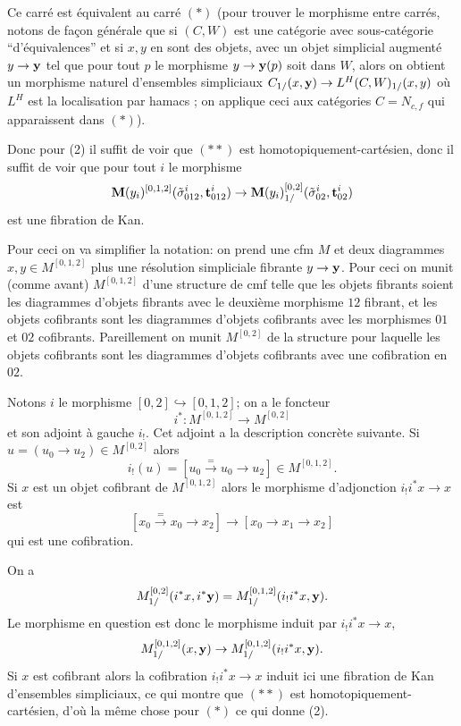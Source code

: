 \documentclass[12pt]{article}
\newcommand{\mm}{{\bf M}}
\begin{document}
Ce carr\'e est \'equivalent au carr\'e $(\ast )$
(pour trouver le morphisme entre carr\'es, notons de fa\c{c}on g\'en\'erale que
si $(C,W)$ est une cat\'egorie avec sous-cat\'egorie ``d'\'equivalences'' et si
$x,y$
en sont des objets, avec un objet simplicial augment\'e $y\rightarrow {\bf y}$
tel que pour tout $p$ le morphisme $y\rightarrow {\bf y}(p)$ soit dans $W$,
alors on obtient un morphisme naturel d'ensembles simpliciaux
$C_{1/}(x,{\bf y})\rightarrow L^H(C,W)_{1/}(x,y)$ o\`u $L^H$ est la
localisation par hamacs \cite{DwyerKan2} \cite{DwyerKan3}; on applique ceci aux
cat\'egories $C=N_{c,f}$ qui apparaissent dans $(\ast )$).

Donc pour (2) il suffit de voir que $(\ast \ast )$ est
homotopiquement-cart\'esien,
donc il suffit de voir que pour tout $i$ le morphisme
$$
\mm (y_i)^{[0,1,2]}(\tilde{\sigma} ^i_{012},{\bf t} ^i
_{012})\rightarrow
\mm (y_i)^{[0,2]}_{1/}(\tilde{\sigma} ^i_{02},{\bf t}
^i_{02})
$$
est une fibration de Kan.

Pour ceci
on va simplifier la notation: on prend une cfm $M$ et deux diagrammes
$x,y\in M^{[0,1,2]}$ plus une r\'esolution simpliciale fibrante $y\rightarrow
{\bf y}$. Pour ceci on munit (comme avant) $M^{[0,1,2]}$ d'une structure de cmf
telle que les objets fibrants soient les diagrammes d'objets fibrants avec le
deuxi\`eme morphisme $12$ fibrant, et les objets cofibrants sont les diagrammes
d'objets cofibrants avec les morphismes $01$ et $02$ cofibrants. Pareillement on
munit $M^{[0,2]}$ de la structure pour laquelle les objets cofibrants sont
les diagrammes d'objets cofibrants avec une cofibration en $02$.

Notons $i$ le morphisme $ [0,2]\hookrightarrow [0,1,2]$; on a le foncteur
$$
i^{\ast}: M^{[0,1,2]}\rightarrow M^{[0,2]}
$$
et son adjoint \`a gauche $i_!$. Cet adjoint a la description concr\`ete
suivante. Si $u= (u_0\rightarrow u_2)\in M^{[0,2]}$ alors
$$
i_!(u)= [u_0 \stackrel{=}{\rightarrow} u_0 \rightarrow u_2]\in M^{[0,1,2]}.
$$
Si $x$ est un objet cofibrant de $M^{[0,1,2]}$ alors
le morphisme d'adjonction $i_!i^{\ast}x\rightarrow x$ est
$$
[x_0 \stackrel{=}{\rightarrow} x_0 \rightarrow x_2]
\rightarrow [x_0\rightarrow x_1\rightarrow x_2]
$$
qui est une cofibration.

On a
$$
M^{[0,2]}_{1/}(i^{\ast} x, i^{\ast} {\bf y})=
M^{[0,1,2]}_{1/}(i_!i^{\ast} x, {\bf y}).
$$
Le morphisme en question est donc le morphisme induit par
$i_!i^{\ast}x\rightarrow x$,
$$
M^{[0,1,2]}_{1/}(x, {\bf y})
\rightarrow
M^{[0,1,2]}_{1/}(i_!i^{\ast} x, {\bf y}).
$$
Si $x$ est cofibrant alors la cofibration $i_!i^{\ast}x\rightarrow x$
induit ici une fibration de Kan d'ensembles simpliciaux,
ce qui montre que $(\ast \ast )$ est homotopiquement-cart\'esien,
d'o\`u la m\^eme chose
pour $(\ast )$ ce qui donne (2).
\end{document}
